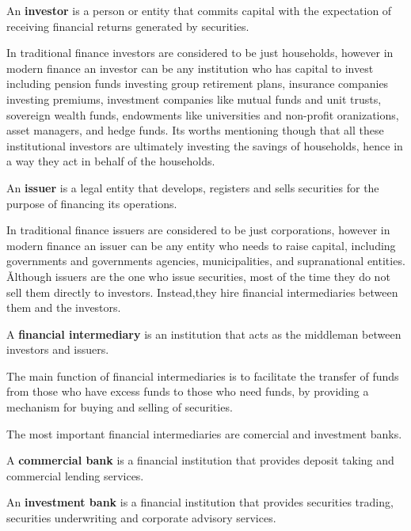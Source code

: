 \bd[Investor]
An \textbf{investor} is a person or entity that commits capital with the expectation of receiving financial returns
generated by securities.
\ed

In traditional finance investors are considered to be just households, however in modern finance an investor can be any
institution who has capital to invest including pension funds investing group retirement plans, insurance companies
investing premiums, investment companies like mutual funds and unit trusts, sovereign wealth funds, endowments like
universities and non-profit oranizations, asset managers, and hedge funds. Its worths mentioning though that all these
institutional investors are ultimately investing the savings of households, hence in a way they act in behalf of the
households.

\bd[Issuer]
An \textbf{issuer} is a legal entity that develops, registers and sells securities for the purpose of financing its
operations.
\ed

In traditional finance issuers are considered to be just corporations, however in modern finance an issuer can be any
entity who needs to raise capital, including governments and governments agencies, municipalities, and supranational
entities. \v

Although issuers are the one who issue securities, most of the time they do not sell them directly to investors.
Instead,they hire financial intermediaries between them and the investors.

A \textbf{financial intermediary} is an institution that acts as the middleman between investors and issuers.
\ed

The main function of financial intermediaries is to facilitate the transfer of funds from those who have excess funds
to those who need funds, by providing a mechanism for buying and selling of securities.

\vspace{5pt}
\vspace{5pt}

The most important financial intermediaries are comercial and investment banks.

A \textbf{commercial bank} is a financial institution that provides deposit taking and commercial lending services.
\ed

An \textbf{investment bank} is a financial institution that provides securities trading, securities underwriting and
corporate advisory services.
\ed


